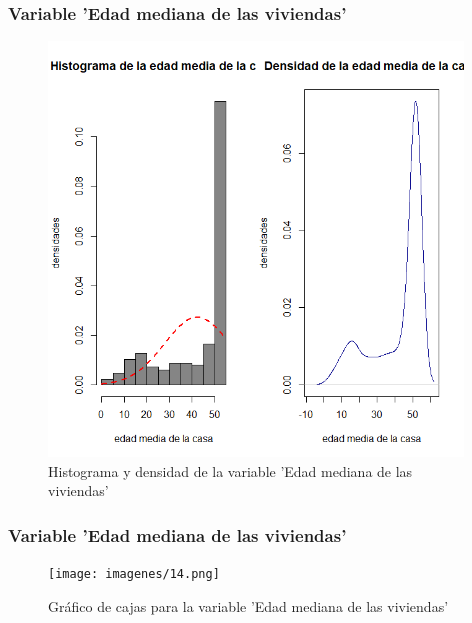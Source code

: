 \documentclass[12pt]{beamer}
\begin{document}
\begin{frame}
\frametitle{Variable 'Edad mediana de las viviendas'}
\begin{figure}[!h]
    \begin{center}
        \includegraphics[width=11cm]{imagenes/3.png}
        \caption{Histograma y densidad de la variable 'Edad mediana de las viviendas'}
        \label{fig:Densidad}
    \end{center}
\end{figure}
\end{frame}
\begin{frame}
\frametitle{Variable 'Edad mediana de las viviendas'}
\begin{figure}[!h]
    \begin{center}
        \texttt{[image: imagenes/14.png]}
        \caption{Gráfico de cajas para la variable 'Edad mediana de las viviendas'}
        \label{fig:Densidad}
    \end{center}
\end{figure}
\end{frame}
\end{document}
